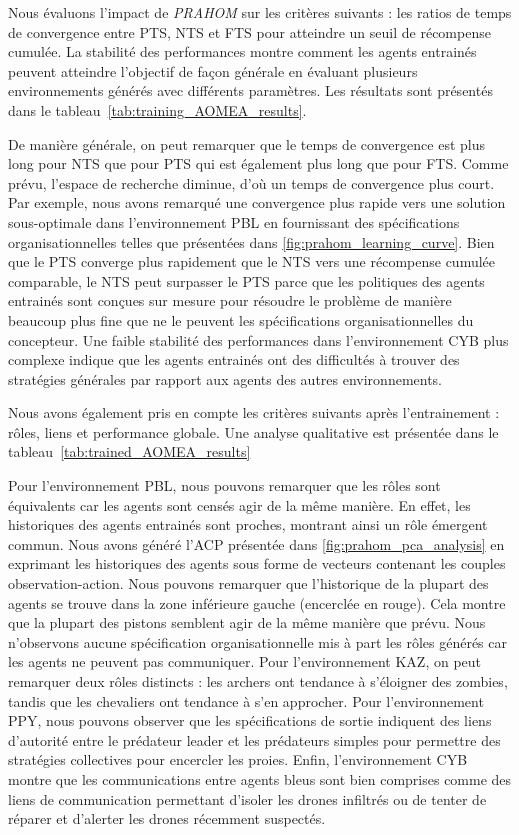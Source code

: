 \documentclass[contribution]{jfsma}
\begin{document}
Nous évaluons l'impact de \emph{PRAHOM} sur les critères suivants : les ratios de temps de convergence entre PTS, NTS et FTS pour atteindre un seuil de récompense cumulée. La stabilité des performances montre comment les agents entrainés peuvent atteindre l'objectif de façon générale en évaluant plusieurs environnements générés avec différents paramètres. Les résultats sont présentés dans le tableau~\ref{tab:training_AOMEA_results}.
%

%
De manière générale, on peut remarquer que le temps de convergence est plus long pour NTS que pour PTS qui est également plus long que pour FTS. Comme prévu, l’espace de recherche diminue, d’où un temps de convergence plus court. Par exemple, nous avons remarqué une convergence plus rapide vers une solution sous-optimale dans l’environnement PBL en fournissant des spécifications organisationnelles telles que présentées dans \autoref{fig:prahom_learning_curve}. Bien que le PTS converge plus rapidement que le NTS vers une récompense cumulée comparable, le NTS peut surpasser le PTS parce que les politiques des agents entrainés sont conçues sur mesure pour résoudre le problème de manière beaucoup plus fine que ne le peuvent les spécifications organisationnelles du concepteur. Une faible stabilité des performances dans l'environnement CYB plus complexe indique que les agents entrainés ont des difficultés à trouver des stratégies générales par rapport aux agents des autres environnements.

Nous avons également pris en compte les critères suivants après l'entrainement : rôles, liens et performance globale. Une analyse qualitative est présentée dans le tableau~\ref{tab:trained_AOMEA_results}
%

%
%
Pour l'environnement PBL, nous pouvons remarquer que les rôles sont équivalents car les agents sont censés agir de la même manière. En effet, les historiques des agents entrainés sont proches, montrant ainsi un rôle émergent commun. Nous avons généré l'ACP présentée dans \autoref{fig:prahom_pca_analysis} en exprimant les historiques des agents sous forme de vecteurs contenant les couples observation-action. Nous pouvons remarquer que l'historique de la plupart des agents se trouve dans la zone inférieure gauche (encerclée en rouge). Cela montre que la plupart des pistons semblent agir de la même manière que prévu. Nous n'observons aucune spécification organisationnelle mis à part les rôles générés car les agents ne peuvent pas communiquer. Pour l'environnement KAZ, on peut remarquer deux rôles distincts : les archers ont tendance à s'éloigner des zombies, tandis que les chevaliers ont tendance à s'en approcher. Pour l'environnement PPY, nous pouvons observer que les spécifications de sortie indiquent des liens d'autorité entre le prédateur leader et les prédateurs simples pour permettre des stratégies collectives pour encercler les proies. Enfin, l’environnement CYB montre que les communications entre agents bleus sont bien comprises comme des liens de communication permettant d’isoler les drones infiltrés ou de tenter de réparer et d’alerter les drones récemment suspectés.
\end{document}
